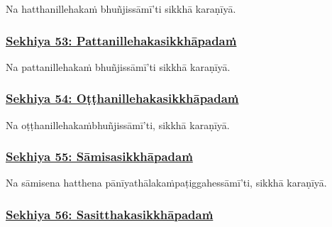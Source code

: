 Na hatthanillehakaṁ bhuñjissāmī'ti sikkhā karaṇīyā.



\subsubsection*{\hyperref[training53]{Sekhiya 53: Pattanillehakasikkhāpadaṁ}}
\label{sekh53}

Na pattanillehakaṁ bhuñjissāmī'ti sikkhā karaṇīyā.



\subsubsection*{\hyperref[training54]{Sekhiya 54: Oṭṭhanillehakasikkhāpadaṁ}}
\label{sekh54}

Na oṭṭhanillehakaṁ\makeatletter\hyperlink{endnote503-appendix}\makeatother \thinspace bhuñjissāmī'ti, sikkhā karaṇīyā.



\subsubsection*{\hyperref[training55]{Sekhiya 55: Sāmisasikkhāpadaṁ}}
\label{sekh55}

Na sāmisena hatthena pānīyathālakaṁ\makeatletter\hyperlink{endnote504-appendix}\makeatother \thinspace paṭiggahessāmī'ti, sikkhā karaṇīyā.



\subsubsection*{\hyperref[training56]{Sekhiya 56: Sasitthakasikkhāpadaṁ}}
\label{sekh56}


